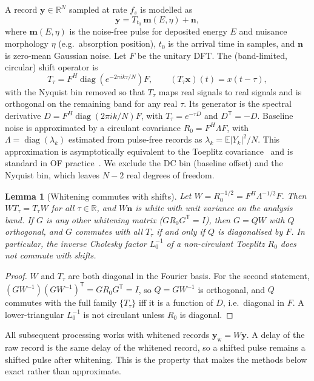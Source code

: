 \documentclass[aps,prapplied,reprint,superscriptaddress,longbibliography,nofootinbib]{revtex4-2}
\newtheorem{lemma}{Lemma}
\theoremstyle{remark}
\newcommand{\T}{\mathsf{T}}
\newcommand{\R}{\mathbb{R}}
\newcommand{\E}{\mathbb{E}}
\newcommand{\vect}[1]{\bm{#1}}
\newcommand{\Sh}[1]{T_{#1}}
\newcommand{\yw}{\vect{y}_{\mathrm w}}
\begin{document}
A record $\vect y\in\R^N$ sampled at rate $f_s$ is modelled as
\begin{equation}
\vect y = \Sh{t_0}\,\vect m(E,\eta) + \vect n ,
\label{eq:model}
\end{equation}
where $\vect m(E,\eta)$ is the noise-free pulse for deposited energy $E$ and
nuisance morphology $\eta$ (e.g.\ absorption position), $t_0$ is the arrival time
in samples, and $\vect n$ is zero-mean Gaussian noise. Let $F$ be the unitary DFT.
The (band-limited, circular) shift operator is
\begin{equation}
\Sh{\tau} = F^{H}\operatorname{diag}\!\left(e^{-2\pi i k\tau/N}\right)F, \qquad
(\Sh{\tau}\vect x)(t)=x(t-\tau),
\end{equation}
with the Nyquist bin removed so that $\Sh\tau$ maps real signals to real signals and
is orthogonal on the remaining band for any real $\tau$. Its generator is the
spectral derivative $D=F^H\operatorname{diag}(2\pi i k/N)F$, with
$\Sh{\tau}=e^{-\tau D}$ and $D^\T=-D$. Baseline noise is approximated by a
circulant covariance $R_0=F^H\Lambda F$, with $\Lambda=\operatorname{diag}(\lambda_k)$
estimated from pulse-free records as $\lambda_k=\E|Y_k|^2/N$. This approximation
is asymptotically equivalent to the Toeplitz covariance~\cite{Gray2006} and is
standard in OF practice~\cite{Szymkowiak1993}. We exclude the DC bin (baseline
offset) and the Nyquist bin, which leaves $N-2$ real degrees of freedom.

\begin{lemma}[Whitening commutes with shifts]\label{lem:commute}
Let $W=R_0^{-1/2}=F^H\Lambda^{-1/2}F$. Then $W\Sh\tau=\Sh\tau W$ for all
$\tau\in\R$, and $W\vect n$ is white with unit variance on the analysis band. If $G$
is any other whitening matrix ($GR_0G^\T=I$), then $G=QW$ with $Q$ orthogonal, and
$G$ commutes with all $\Sh\tau$ if and only if $Q$ is diagonalised by $F$. In
particular, the inverse Cholesky factor $L_0^{-1}$ of a non-circulant Toeplitz
$R_0$ does not commute with shifts.
\end{lemma}
\begin{proof}
$W$ and $\Sh\tau$ are both diagonal in the Fourier basis. For the second statement,
$(GW^{-1})(GW^{-1})^\T=GR_0G^\T=I$, so $Q=GW^{-1}$ is orthogonal, and $Q$ commutes
with the full family $\{\Sh\tau\}$ iff it is a function of $D$, i.e.\ diagonal in
$F$. A lower-triangular $L_0^{-1}$ is not circulant unless $R_0$ is diagonal.
\end{proof}

All subsequent processing works with whitened records $\yw=W\vect y$. A delay of the
raw record is the same delay of the whitened record, so a shifted pulse remains a
shifted pulse after whitening. This is the property that makes the methods below
exact rather than approximate.
\end{document}
